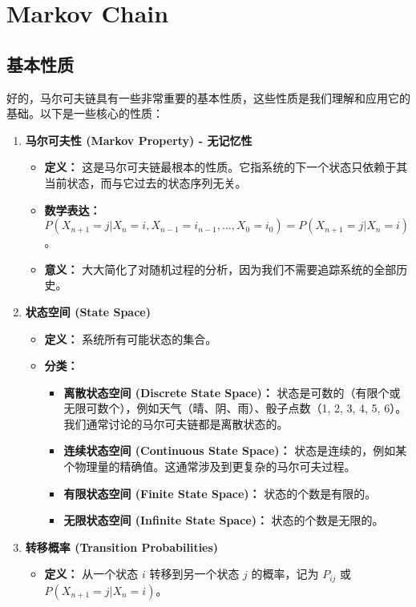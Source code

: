 \section{Markov Chain}

\subsection{基本性质}

好的，马尔可夫链具有一些非常重要的基本性质，这些性质是我们理解和应用它的基础。以下是一些核心的性质：

\begin{enumerate}
	\item \textbf{马尔可夫性 (Markov Property) - 无记忆性}
	\begin{itemize}
		\item \textbf{定义：} 这是马尔可夫链最根本的性质。它指系统的下一个状态只依赖于其当前状态，而与它过去的状态序列无关。
		\item \textbf{数学表达：} $P(X_{n+1} = j | X_n = i, X_{n-1} = i_{n-1}, ..., X_0 = i_0) = P(X_{n+1} = j | X_n = i)$。
		\item \textbf{意义：} 大大简化了对随机过程的分析，因为我们不需要追踪系统的全部历史。
	\end{itemize}
	\item \textbf{状态空间 (State Space)}
	\begin{itemize}
		\item \textbf{定义：} 系统所有可能状态的集合。
		\item \textbf{分类：}
		\begin{itemize}
			\item \textbf{离散状态空间 (Discrete State Space)：} 状态是可数的（有限个或无限可数个），例如天气（晴、阴、雨）、骰子点数（1, 2, 3, 4, 5, 6）。我们通常讨论的马尔可夫链都是离散状态的。
			\item \textbf{连续状态空间 (Continuous State Space)：} 状态是连续的，例如某个物理量的精确值。这通常涉及到更复杂的马尔可夫过程。
			\item \textbf{有限状态空间 (Finite State Space)：} 状态的个数是有限的。
			\item \textbf{无限状态空间 (Infinite State Space)：} 状态的个数是无限的。
		\end{itemize}
	\end{itemize}
	\item \textbf{转移概率 (Transition Probabilities)}
	\begin{itemize}
		\item \textbf{定义：} 从一个状态 $i$ 转移到另一个状态 $j$ 的概率，记为 $P_{ij}$ 或 $P(X_{n+1}=j | X_n=i)$。

\end{itemize}
\end{enumerate}
